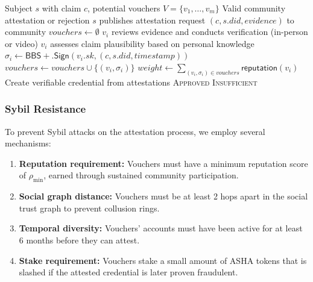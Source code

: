 \documentclass[11pt,a4paper]{article}
\begin{document}
\begin{algorithm}[H]
\caption{Community Attestation Protocol}
\label{alg:attest}
\begin{algorithmic}[1]
\Require Subject $s$ with claim $c$, potential vouchers $V = \{v_1, \ldots, v_m\}$
\Ensure Valid community attestation or rejection
\State $s$ publishes attestation request $(c, s.\mathit{did}, \mathit{evidence})$ to community
\State $\mathit{vouchers} \leftarrow \emptyset$
    \State $v_i$ reviews evidence and conducts verification (in-person or video)
    \State $v_i$ assesses claim plausibility based on personal knowledge
        \State $\sigma_i \leftarrow \mathsf{BBS{+}.Sign}(v_i.\mathit{sk}, (c, s.\mathit{did}, \mathit{timestamp}))$
        \State $\mathit{vouchers} \leftarrow \mathit{vouchers} \cup \{(v_i, \sigma_i)\}$
    \EndIf
\EndFor
{}
    \State $\mathit{weight} \leftarrow \sum_{(v_i, \sigma_i) \in \mathit{vouchers}} \mathsf{reputation}(v_i)$
     
        \State Create verifiable credential from attestations
        \State \Return \textsc{Approved}
    \EndIf
\EndIf
\State \Return \textsc{Insufficient}
\end{algorithmic}
\end{algorithm}

\subsubsection{Sybil Resistance}

To prevent Sybil attacks on the attestation process, we employ several mechanisms:

\begin{enumerate}
    \item \textbf{Reputation requirement:} Vouchers must have a minimum reputation score of $\rho_{\min}$, earned through sustained community participation.
    \item \textbf{Social graph distance:} Vouchers must be at least 2 hops apart in the social trust graph to prevent collusion rings.
    \item \textbf{Temporal diversity:} Vouchers' accounts must have been active for at least 6 months before they can attest.
    \item \textbf{Stake requirement:} Vouchers stake a small amount of ASHA tokens that is slashed if the attested credential is later proven fraudulent.
\end{enumerate}
\end{document}

